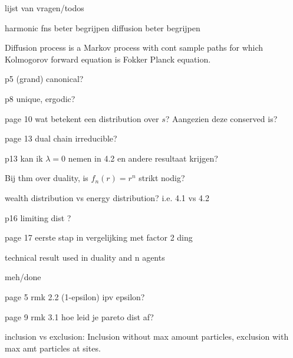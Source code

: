 lijst van vragen/todos

harmonic fns beter begrijpen
diffusion beter begrijpen

Diffusion process is a Markov process with cont sample paths for which Kolmogorov forward equation is Fokker Planck equation.



p5 (grand) canonical?

p8 unique, ergodic?

page 10
wat betekent een distribution over $s$? Aangezien deze conserved is? %

page 13 dual chain irreducible?

p13 kan ik $\lambda = 0$ nemen in 4.2 en andere resultaat krijgen?

Bij thm over duality, is $f_n(r) = r^n$ strikt nodig?

wealth distribution vs energy distribution? i.e. 4.1 vs 4.2

p16 limiting dist ?


page 17 eerste stap in vergelijking met factor 2 ding

technical result used in duality and n agents


meh/done

page 5 rmk 2.2 (1-epsilon) ipv epsilon?

page 9 rmk 3.1 hoe leid je pareto dist af?







inclusion vs exclusion: Inclusion without max amount particles, exclusion with max amt particles at sites.
